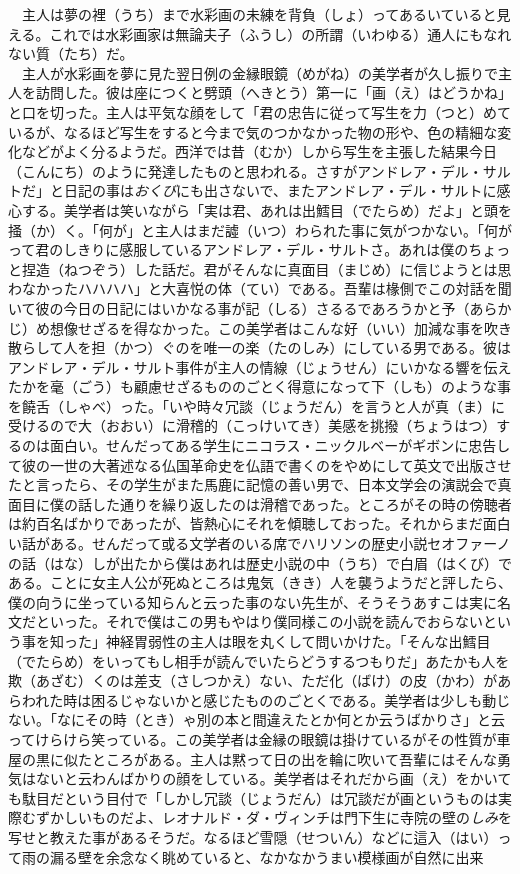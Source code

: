 \documentclass{book}
\begin{document}
　主人は夢の裡（うち）まで水彩画の未練を背負（しょ）ってあるいていると見える。これでは水彩画家は無論夫子（ふうし）の所謂（いわゆる）通人にもなれない質（たち）だ。\\
　主人が水彩画を夢に見た翌日例の金縁眼鏡（めがね）の美学者が久し振りで主人を訪問した。彼は座につくと劈頭（へきとう）第一に「画（え）はどうかね」と口を切った。主人は平気な顔をして「君の忠告に従って写生を力（つと）めているが、なるほど写生をすると今まで気のつかなかった物の形や、色の精細な変化などがよく分るようだ。西洋では昔（むか）しから写生を主張した結果今日（こんにち）のように発達したものと思われる。さすがアンドレア・デル・サルトだ」と日記の事は\emph{おくび}にも出さないで、またアンドレア・デル・サルトに感心する。美学者は笑いながら「実は君、あれは出鱈目（でたらめ）だよ」と頭を掻（か）く。「何が」と主人はまだ譃（いつ）わられた事に気がつかない。「何がって君のしきりに感服しているアンドレア・デル・サルトさ。あれは僕のちょっと捏造（ねつぞう）した話だ。君がそんなに真面目（まじめ）に信じようとは思わなかったハハハハ」と大喜悦の体（てい）である。吾輩は椽側でこの対話を聞いて彼の今日の日記にはいかなる事が記（しる）さるるであろうかと予（あらかじ）め想像せざるを得なかった。この美学者はこんな好（いい）加減な事を吹き散らして人を担（かつ）ぐのを唯一の楽（たのしみ）にしている男である。彼はアンドレア・デル・サルト事件が主人の情線（じょうせん）にいかなる響を伝えたかを毫（ごう）も顧慮せざるもののごとく得意になって下（しも）のような事を饒舌（しゃべ）った。「いや時々冗談（じょうだん）を言うと人が真（ま）に受けるので大（おおい）に滑稽的（こっけいてき）美感を挑撥（ちょうはつ）するのは面白い。せんだってある学生にニコラス・ニックルベーがギボンに忠告して彼の一世の大著述なる仏国革命史を仏語で書くのをやめにして英文で出版させたと言ったら、その学生がまた馬鹿に記憶の善い男で、日本文学会の演説会で真面目に僕の話した通りを繰り返したのは滑稽であった。ところがその時の傍聴者は約百名ばかりであったが、皆熱心にそれを傾聴しておった。それからまだ面白い話がある。せんだって或る文学者のいる席でハリソンの歴史小説セオファーノの話（はな）しが出たから僕はあれは歴史小説の中（うち）で白眉（はくび）である。ことに女主人公が死ぬところは鬼気（きき）人を襲うようだと評したら、僕の向うに坐っている知らんと云った事のない先生が、そうそうあすこは実に名文だといった。それで僕はこの男もやはり僕同様この小説を読んでおらないという事を知った」神経胃弱性の主人は眼を丸くして問いかけた。「そんな出鱈目（でたらめ）をいってもし相手が読んでいたらどうするつもりだ」あたかも人を欺（あざむ）くのは差支（さしつかえ）ない、ただ化（ばけ）の皮（かわ）があらわれた時は困るじゃないかと感じたもののごとくである。美学者は少しも動じない。「なにその時（とき）ゃ別の本と間違えたとか何とか云うばかりさ」と云ってけらけら笑っている。この美学者は金縁の眼鏡は掛けているがその性質が車屋の黒に似たところがある。主人は黙って日の出を輪に吹いて吾輩にはそんな勇気はないと云わんばかりの顔をしている。美学者はそれだから画（え）をかいても駄目だという目付で「しかし冗談（じょうだん）は冗談だが画というものは実際むずかしいものだよ、レオナルド・ダ・ヴィンチは門下生に寺院の壁の\emph{しみ}を写せと教えた事があるそうだ。なるほど雪隠（せついん）などに這入（はい）って雨の漏る壁を余念なく眺めていると、なかなかうまい模様画が自然に出来
\end{document}
